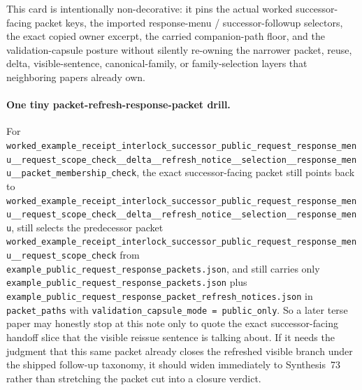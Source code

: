 \documentclass[11pt]{article}
\begin{document}
This card is intentionally non-decorative: it pins the actual worked successor-facing packet keys, the imported response-menu / successor-followup selectors, the exact copied owner excerpt, the carried companion-path floor, and the validation-capsule posture without silently re-owning the narrower packet, reuse, delta, visible-sentence, canonical-family, or family-selection layers that neighboring papers already own.\cite{series:workedexample}

\paragraph{One tiny packet-refresh-response-packet drill.}
For \nolinkurl{worked_example_receipt_interlock_successor_public_request_response_menu__request_scope_check__delta__refresh_notice__selection__response_menu__packet_membership_check}, the exact successor-facing packet still points back to \nolinkurl{worked_example_receipt_interlock_successor_public_request_response_menu__request_scope_check__delta__refresh_notice__selection__response_menu}, still selects the predecessor packet \nolinkurl{worked_example_receipt_interlock_successor_public_request_response_menu__request_scope_check} from \nolinkurl{example_public_request_response_packets.json}, and still carries only \nolinkurl{example_public_request_response_packets.json} plus \nolinkurl{example_public_request_response_packet_refresh_notices.json} in \nolinkurl{packet_paths} with \nolinkurl{validation_capsule_mode = public_only}. So a later terse paper may honestly stop at this note only to quote the exact successor-facing handoff slice that the visible reissue sentence is talking about. If it needs the judgment that this same packet already closes the refreshed visible branch under the shipped follow-up taxonomy, it should widen immediately to Synthesis~73 rather than stretching the packet cut into a closure verdict.\cite{series:workedexample}
\end{document}

